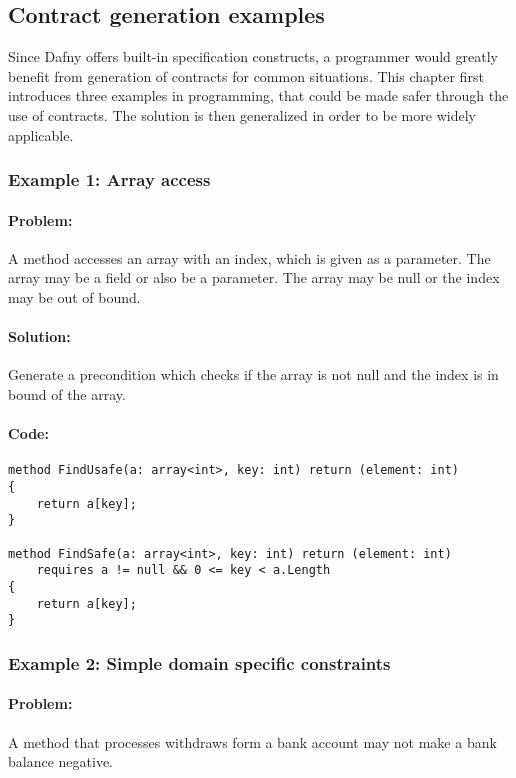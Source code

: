 \subsection{Contract generation examples} \label{examples}
Since Dafny offers built-in specification constructs, a programmer would greatly benefit from generation of contracts for common situations. This chapter first introduces three examples in programming, that could be made safer through the use of contracts. The solution is then generalized in order to be more widely applicable.
\subsubsection{Example 1: Array access} \label{Example 1}

\paragraph{Problem:}

A method accesses an array with an index, which is given as a parameter. The array may be a field or also be a parameter. The array may be null or the index may be out of bound.
\paragraph{Solution:}
Generate a precondition which checks if the array is not null and the index is in bound of the array.

\paragraph{Code:}
\begin{lstlisting}[language=dafny]
method FindUsafe(a: array<int>, key: int) return (element: int)
{
	return a[key];
}

method FindSafe(a: array<int>, key: int) return (element: int)
	requires a != null && 0 <= key < a.Length
{
	return a[key];
}
\end{lstlisting}



\subsubsection{Example 2: Simple domain specific constraints} \label{Example 2}
\paragraph{Problem:}
A method that processes withdraws form a bank account may not make a bank balance negative.
